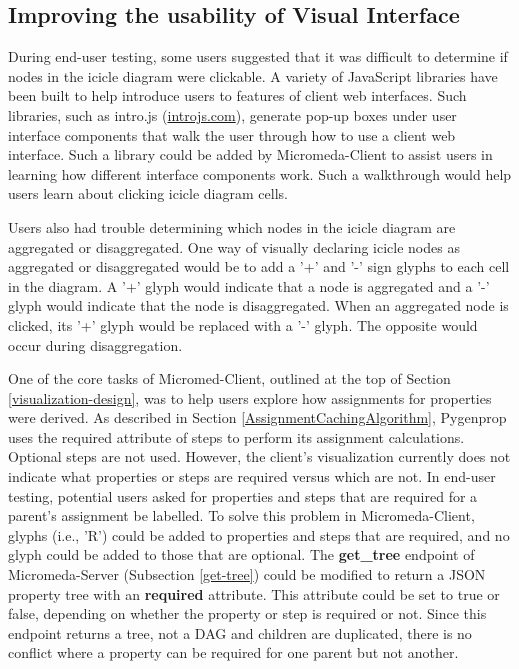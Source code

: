 \subsection{Improving the usability of Visual Interface}

During end-user testing, some users suggested that it was difficult to determine if nodes in the icicle diagram were clickable. A variety of JavaScript libraries have been built to help introduce users to features of client web interfaces. Such libraries, such as intro.js \cite{mehrabani} (\href{introjs.com}{introjs.com}), generate pop-up boxes under user interface components that walk the user through how to use a client web interface. Such a library could be added by Micromeda-Client to assist users in learning how different interface components work. Such a walkthrough would help users learn about clicking icicle diagram cells.

Users also had trouble determining which nodes in the icicle diagram are aggregated or disaggregated. One way of visually declaring icicle nodes as aggregated or disaggregated would be to add a '+' and '-' sign glyphs to each cell in the diagram. A '+' glyph would indicate that a node is aggregated and a '-' glyph would indicate that the node is disaggregated. When an aggregated node is clicked, its '+' glyph would be replaced with a '-' glyph. The opposite would occur during disaggregation.

One of the core tasks of Micromed-Client, outlined at the top of Section \ref{visualization-design}, was to help users explore how assignments for properties were derived. As described in Section \ref{AssignmentCachingAlgorithm}, Pygenprop uses the required attribute of steps to perform its assignment calculations. Optional steps are not used. However, the client's visualization currently does not indicate what properties or steps are required versus which are not. In end-user testing, potential users asked for properties and steps that are required for a parent's assignment be labelled. To solve this problem in Micromeda-Client, glyphs (i.e., 'R') could be added to properties and steps that are required, and no glyph could be added to those that are optional. The \textbf{get\_tree} endpoint of Micromeda-Server (Subsection \ref{get-tree}) could be modified to return a JSON property tree with an \textbf{required} attribute. This attribute could be set to true or false, depending on whether the property or step is required or not. Since this endpoint returns a tree, not a DAG and children are duplicated, there is no conflict where a property can be required for one parent but not another.

